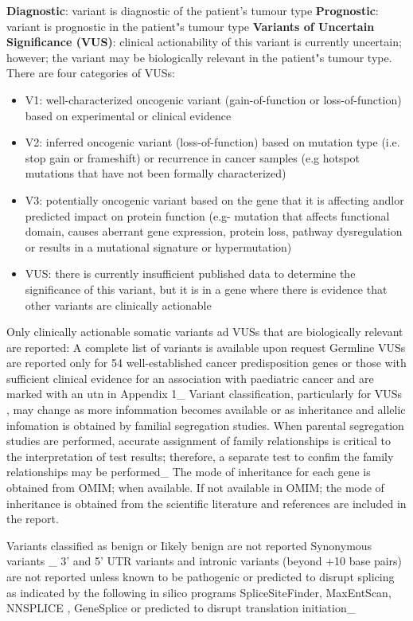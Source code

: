 \documentclass[8pt,letterpaper]{extarticle}
\begin{document}
{{\bf Diagnostic}: variant is diagnostic of the patient's tumour type 
{\bf Prognostic}: variant is prognostic in the patient"s tumour type 
{\bf Variants of Uncertain Significance (VUS)}: clinical actionability of this variant is currently uncertain; however; the variant may be biologically relevant in the patient"s tumour type. There are four categories of VUSs: 
\begin{itemize}
  \setlength\itemsep{1pt}
  \item V1: well-characterized oncogenic variant (gain-of-function or loss-of-function) based on experimental or clinical evidence 
  \item V2: inferred oncogenic variant (loss-of-function) based on mutation type (i.e. stop gain or frameshift) or recurrence in cancer samples (e.g hotspot mutations that have not been formally characterized) 
  \item V3: potentially oncogenic variant based on the gene that it is affecting andlor predicted impact on protein function (e.g- mutation that affects functional domain, causes aberrant gene expression, protein loss, pathway dysregulation or results in a mutational signature or hypermutation) 
  \item VUS: there is currently insufficient published data to determine the significance of this variant, but it is in a gene where there is evidence that other variants are clinically actionable 
\end{itemize}

Only clinically actionable somatic variants ad VUSs that are biologically relevant are reported: A complete list of variants is available upon request Germline VUSs are reported only for 54 well-established cancer predisposition genes or those with sufficient clinical evidence for an association with paediatric cancer and are marked with an utn in Appendix 1\_ Variant classification, particularly for VUSs , may change as more infommation becomes available or as inheritance and allelic infomation is obtained by familial segregation studies. When parental segregation studies are performed, accurate assignment of family relationships is critical to the interpretation of test results; therefore, a separate test to confim the family relationships may be performed\_ The mode of inheritance for each gene is obtained from OMIM; when available. If not available in OMIM; the mode of inheritance is obtained from the scientific literature and references are included in the report.

Variants classified as benign or Iikely benign are not reported  Synonymous variants \_ 3' and 5' UTR variants and intronic variants (beyond +10 base pairs) are not reported unless known to be pathogenic or predicted to disrupt splicing as indicated by the following in silico programs SpliceSiteFinder, MaxEntScan, NNSPLICE , GeneSplice or predicted to disrupt translation initiation\_

}
\end{document}
